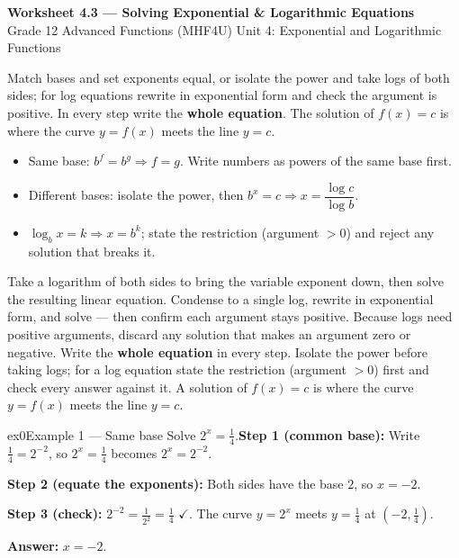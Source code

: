 \documentclass[11pt]{article}
\begin{document}
\begin{center}
{\LARGE\bfseries\color{titleblue}Worksheet 4.3 --- Solving Exponential \& Logarithmic Equations}\\[2pt]
{\small Grade 12 Advanced Functions (MHF4U) \textperiodcentered{} Unit 4: Exponential and Logarithmic Functions}
\end{center}

\begin{ideabox}
Match bases and set exponents equal, or isolate the power and take logs of both sides; for log equations rewrite in exponential form and check the argument is positive. In every step write the \textbf{whole equation}. The solution of $f(x)=c$ is where the curve $y=f(x)$ meets the line $y=c$.
\begin{itemize}[leftmargin=*,itemsep=2pt]
  \item Same base: $b^{f}=b^{g}\Rightarrow f=g$. Write numbers as powers of the same base first.
  \item Different bases: isolate the power, then $b^x=c\Rightarrow x=\dfrac{\log c}{\log b}$.
  \item $\log_b x=k\Rightarrow x=b^k$; state the restriction (argument $>0$) and reject any solution that breaks it.
\end{itemize}
\end{ideabox}

\begin{learnbox}
Take a logarithm of both sides to bring the variable exponent down, then solve the resulting linear equation.
Condense to a single log, rewrite in exponential form, and solve — then confirm each argument stays positive.
Because logs need positive arguments, discard any solution that makes an argument zero or negative.
Write the \textbf{whole equation} in every step. Isolate the power before taking logs; for a log equation state the restriction (argument $>0$) first and check every answer against it. A solution of $f(x)=c$ is where the curve $y=f(x)$ meets the line $y=c$.
\end{learnbox}


\begin{example}{ex0}{Example 1 --- Same base}
Solve $2^x=\tfrac14$.\soln \textbf{Step 1 (common base):} Write $\tfrac14=2^{-2}$, so $2^x=\tfrac14$ becomes $2^x=2^{-2}$.

\textbf{Step 2 (equate the exponents):} Both sides have the base $2$, so $x=-2$.

\textbf{Step 3 (check):} $2^{-2}=\tfrac1{2^2}=\tfrac14$ $\checkmark$. The curve $y=2^x$ meets $y=\tfrac14$ at $\left(-2,\tfrac14\right)$.

\textbf{Answer:} $x=-2$.

\end{example}
\end{document}
